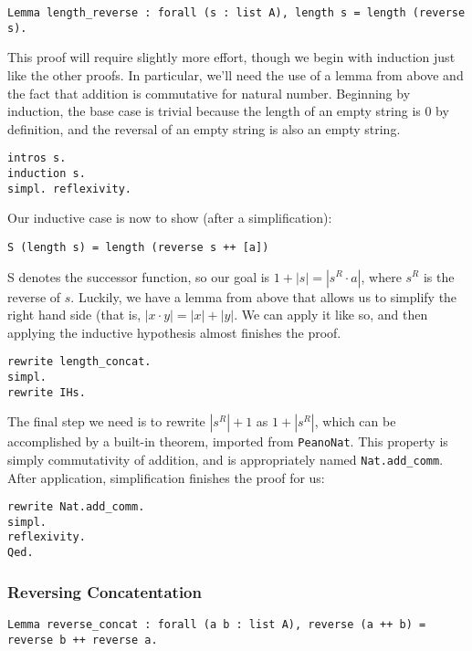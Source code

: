 \begin{verbatim}
Lemma length_reverse : forall (s : list A), length s = length (reverse s).
\end{verbatim}

This proof will require slightly more effort, though we begin with induction just like the other proofs.
In particular, we'll need the use of a lemma from above and the fact that addition is commutative for natural number.
Beginning by induction, the base case is trivial because the length of an empty string is 0 by definition, and the reversal of an empty string is also an empty string.

\begin{verbatim}
intros s.
induction s.
simpl. reflexivity.
\end{verbatim}

Our inductive case is now to show (after a simplification):

\begin{verbatim}
S (length s) = length (reverse s ++ [a])
\end{verbatim}

S denotes the successor function, so our goal is $1 + |s| = |s^R \cdot a|$, where $s^R$ is the reverse of $s$.
Luckily, we have a lemma from above that allows us to simplify the right hand side (that is, $|x \cdot y| = |x| + |y|$.
We can apply it like so, and then applying the inductive hypothesis almost finishes the proof.

\begin{verbatim}
rewrite length_concat.
simpl.
rewrite IHs.
\end{verbatim}

The final step we need is to rewrite $|s^R| + 1$ as $1 + |s^R|$, which can be accomplished by a built-in theorem, imported from \texttt{PeanoNat}.
This property is simply commutativity of addition, and is appropriately named \texttt{Nat.add_comm}.
After application, simplification finishes the proof for us:

\begin{verbatim}
rewrite Nat.add_comm.
simpl.
reflexivity.
Qed.
\end{verbatim}

\subsubsection{Reversing Concatentation}

\begin{verbatim}
Lemma reverse_concat : forall (a b : list A), reverse (a ++ b) = reverse b ++ reverse a.
\end{verbatim}

